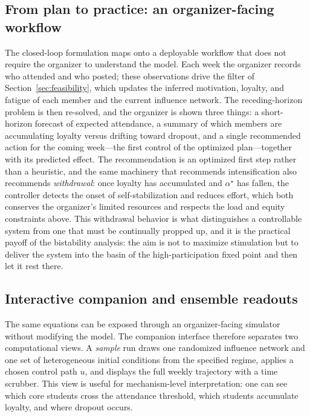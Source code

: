 \documentclass[11pt]{article}
\begin{document}
\subsection{From plan to practice: an organizer-facing workflow}\label{sec:workflow}
The closed-loop formulation maps onto a deployable workflow that does not require the organizer to understand the model. Each week the organizer records who attended and who posted; these observations drive the filter of Section~\ref{sec:feasibility}, which updates the inferred motivation, loyalty, and fatigue of each member and the current influence network. The receding-horizon problem is then re-solved, and the organizer is shown three things: a short-horizon forecast of expected attendance, a summary of which members are accumulating loyalty versus drifting toward dropout, and a single recommended action for the coming week---the first control of the optimized plan---together with its predicted effect. The recommendation is an optimized first step rather than a heuristic, and the same machinery that recommends intensification also recommends \emph{withdrawal}: once loyalty has accumulated and $\alpha^\star$ has fallen, the controller detects the onset of self-stabilization and reduces effort, which both conserves the organizer's limited resources and respects the load and equity constraints above. This withdrawal behavior is what distinguishes a controllable system from one that must be continually propped up, and it is the practical payoff of the bistability analysis: the aim is not to maximize stimulation but to deliver the system into the basin of the high-participation fixed point and then let it rest there.



\subsection{Interactive companion and ensemble readouts}\label{sec:companion}
The same equations can be exposed through an organizer-facing simulator without modifying the model. The companion interface therefore separates two computational views. A \emph{sample} run draws one randomized influence network and one set of heterogeneous initial conditions from the specified regime, applies a chosen control path $u$, and displays the full weekly trajectory with a time scrubber. This view is useful for mechanism-level interpretation: one can see which core students cross the attendance threshold, which students accumulate loyalty, and where dropout occurs.
\end{document}
